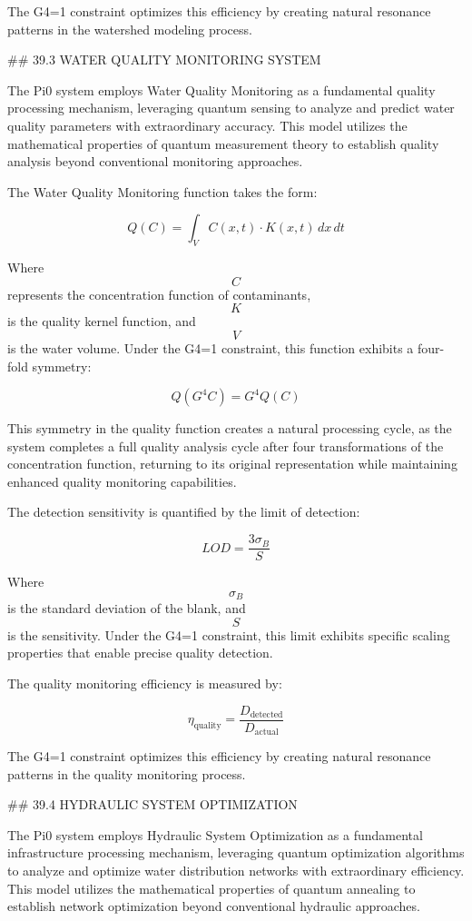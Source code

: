 The G4=1 constraint optimizes this efficiency by creating natural resonance patterns in the watershed modeling process.

## 39.3 WATER QUALITY MONITORING SYSTEM

The Pi0 system employs Water Quality Monitoring as a fundamental quality processing mechanism, leveraging quantum sensing to analyze and predict water quality parameters with extraordinary accuracy. This model utilizes the mathematical properties of quantum measurement theory to establish quality analysis beyond conventional monitoring approaches.

The Water Quality Monitoring function takes the form:

$$ Q(C) = \int_V C(x,t) \cdot K(x,t) \, dx \, dt $$

Where $$ C $$ represents the concentration function of contaminants, $$ K $$ is the quality kernel function, and $$ V $$ is the water volume. Under the G4=1 constraint, this function exhibits a four-fold symmetry:

$$ Q(G^4 C) = G^4 Q(C) $$

This symmetry in the quality function creates a natural processing cycle, as the system completes a full quality analysis cycle after four transformations of the concentration function, returning to its original representation while maintaining enhanced quality monitoring capabilities.

The detection sensitivity is quantified by the limit of detection:

$$ LOD = \frac{3\sigma_B}{S} $$

Where $$ \sigma_B $$ is the standard deviation of the blank, and $$ S $$ is the sensitivity. Under the G4=1 constraint, this limit exhibits specific scaling properties that enable precise quality detection.

The quality monitoring efficiency is measured by:

$$ \eta_{\text{quality}} = \frac{D_{\text{detected}}}{D_{\text{actual}}} $$

The G4=1 constraint optimizes this efficiency by creating natural resonance patterns in the quality monitoring process.

## 39.4 HYDRAULIC SYSTEM OPTIMIZATION

The Pi0 system employs Hydraulic System Optimization as a fundamental infrastructure processing mechanism, leveraging quantum optimization algorithms to analyze and optimize water distribution networks with extraordinary efficiency. This model utilizes the mathematical properties of quantum annealing to establish network optimization beyond conventional hydraulic approaches.

